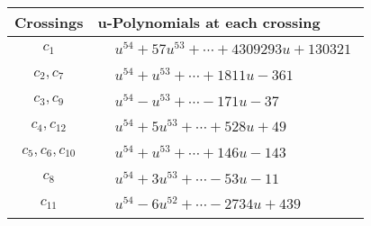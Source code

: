 \documentclass[1p]{elsarticle_modified}
\theoremstyle{definition}
\begin{document}
\begin{tabular}{m{50pt}|m{274pt}}
Crossings & \hspace{64pt}u-Polynomials at each crossing \\
\hline $$\begin{aligned}c_{1}\end{aligned}$$&$\begin{aligned}
&u^{54}+57 u^{53}+\cdots+4309293 u+130321
\end{aligned}$\\
\hline $$\begin{aligned}c_{2},c_{7}\end{aligned}$$&$\begin{aligned}
&u^{54}+u^{53}+\cdots+1811 u-361
\end{aligned}$\\
\hline $$\begin{aligned}c_{3},c_{9}\end{aligned}$$&$\begin{aligned}
&u^{54}- u^{53}+\cdots-171 u-37
\end{aligned}$\\
\hline $$\begin{aligned}c_{4},c_{12}\end{aligned}$$&$\begin{aligned}
&u^{54}+5 u^{53}+\cdots+528 u+49
\end{aligned}$\\
\hline $$\begin{aligned}c_{5},c_{6},c_{10}\end{aligned}$$&$\begin{aligned}
&u^{54}+u^{53}+\cdots+146 u-143
\end{aligned}$\\
\hline $$\begin{aligned}c_{8}\end{aligned}$$&$\begin{aligned}
&u^{54}+3 u^{53}+\cdots-53 u-11
\end{aligned}$\\
\hline $$\begin{aligned}c_{11}\end{aligned}$$&$\begin{aligned}
&u^{54}-6 u^{52}+\cdots-2734 u+439
\end{aligned}$\\
\hline
\end{tabular}\\~\\
\newpage\renewcommand{\arraystretch}{1}
\end{document}
